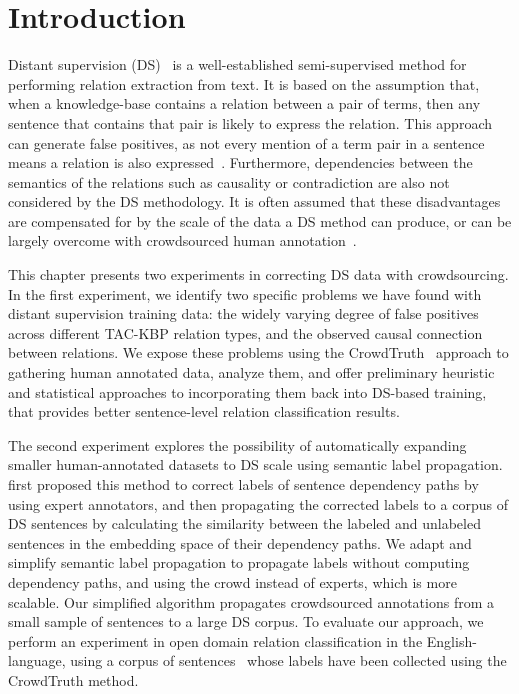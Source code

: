 \section{Introduction}


Distant supervision (DS)~\cite{mintz2009distant,Welty:2010:LSR} is a well-established semi-supervised method for performing relation extraction from text. It is based on the assumption that, when a knowledge-base contains a relation between a pair of terms, then any sentence that contains that pair is likely to express the relation. This approach can generate false positives, as not every mention of a term pair in a sentence means a relation is also expressed~\cite{DBLP:conf/ijcai/FengGQLL17}. Furthermore, dependencies between the semantics of the relations such as causality or contradiction are also not considered by the DS methodology. It is often assumed that these disadvantages are compensated for by the scale of the data a DS method can produce, or can be largely overcome with crowdsourced human annotation~\cite{angeli2014combining,liu2016effective}.  

This chapter presents two experiments in correcting DS data with crowdsourcing. In the first experiment, we identify two specific problems we have found with distant supervision training data: the widely varying degree of false positives across different TAC-KBP relation types, and the observed causal connection between relations. We expose these problems using the CrowdTruth~\cite{aroyo2014threesides,aroyo2015truth,aroyo2013crowd} approach to gathering human annotated data, analyze them, and offer preliminary heuristic and statistical approaches to incorporating them back into DS-based training, that provides better sentence-level relation classification results. %

The second experiment explores the possibility of automatically expanding smaller human-annotated datasets to DS scale using semantic label propagation. \citet{sterckx2016knowledge} first proposed this method to correct labels of sentence dependency paths by using expert annotators, and then propagating the corrected labels to a corpus of DS sentences by calculating the similarity between the labeled and unlabeled sentences in the embedding space of their dependency paths. We adapt and simplify semantic label propagation to propagate labels without computing dependency paths, and using the crowd instead of experts, which is more scalable. Our simplified algorithm propagates crowdsourced annotations from a small sample of sentences to a large DS corpus. To evaluate our approach, we perform an experiment in open domain relation classification in the English-language, using a corpus of sentences~\cite{crowdODrelexdata2016} whose labels have been collected using the CrowdTruth method.


